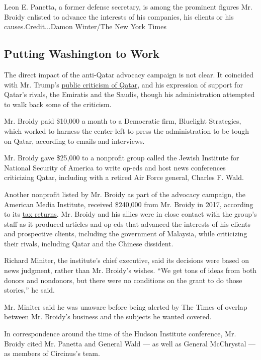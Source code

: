 Leon E. Panetta, a former defense secretary, is among the prominent
figures Mr. Broidy enlisted to advance the interests of his companies,
his clients or his causes.Credit...Damon Winter/The New York Times

\hypertarget{putting-washington-to-work}{%
\subsection{Putting Washington to
Work}\label{putting-washington-to-work}}

The direct impact of the anti-Qatar advocacy campaign is not clear. It
coincided with Mr. Trump's
\href{https://www.nytimes.com/2017/06/06/world/middleeast/trump-qatar-saudi-arabia.html}{public
criticism of Qatar}, and his expression of support for Qatar's rivals,
the Emiratis and the Saudis, though his administration attempted to walk
back some of the criticism.

Mr. Broidy paid \$10,000 a month to a Democratic firm, Bluelight
Strategies, which worked to harness the center-left to press the
administration to be tough on Qatar, according to emails and interviews.

Mr. Broidy gave \$25,000 to a nonprofit group called the Jewish
Institute for National Security of America to write op-eds and host news
conferences criticizing Qatar, including with a retired Air Force
general, Charles F. Wald.

Another nonprofit listed by Mr. Broidy as part of the advocacy campaign,
the American Media Institute, received \$240,000 from Mr. Broidy in
2017, according to its
\href{https://www.documentcloud.org/documents/6234112-American-Media-Institute-s-2017-Tax-Filing.html}{tax
returns}. Mr. Broidy and his allies were in close contact with the
group's staff as it produced articles and op-eds that advanced the
interests of his clients and prospective clients, including the
government of Malaysia, while criticizing their rivals, including Qatar
and the Chinese dissident.

Richard Miniter, the institute's chief executive, said its decisions
were based on news judgment, rather than Mr. Broidy's wishes. ``We get
tons of ideas from both donors and nondonors, but there were no
conditions on the grant to do those stories,'' he said.

Mr. Miniter said he was unaware before being alerted by The Times of
overlap between Mr. Broidy's business and the subjects he wanted
covered.

In correspondence around the time of the Hudson Institute conference,
Mr. Broidy cited Mr. Panetta and General Wald --- as well as General
McChrystal --- as members of Circinus's team.

